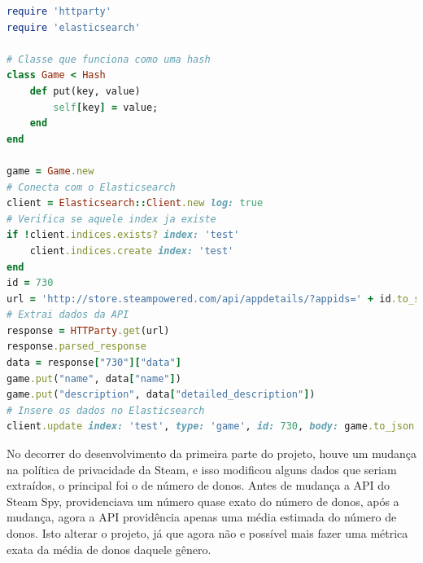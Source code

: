 \begin{lstlisting}[language={Ruby}, caption = {Código do \textit{Plugin}}, label = {code:plugin}]
require 'httparty'
require 'elasticsearch'

# Classe que funciona como uma hash
class Game < Hash
	def put(key, value)
		self[key] = value;
	end
end

game = Game.new
# Conecta com o Elasticsearch
client = Elasticsearch::Client.new log: true
# Verifica se aquele index ja existe
if !client.indices.exists? index: 'test'
	client.indices.create index: 'test'
end
id = 730
url = 'http://store.steampowered.com/api/appdetails/?appids=' + id.to_s
# Extrai dados da API
response = HTTParty.get(url)
response.parsed_response
data = response["730"]["data"]
game.put("name", data["name"])
game.put("description", data["detailed_description"])
# Insere os dados no Elasticsearch
client.update index: 'test', type: 'game', id: 730, body: game.to_json
\end{lstlisting}
No decorrer do desenvolvimento da primeira parte do projeto, houve um mudança na política de privacidade da Steam, e isso modificou alguns dados que seriam extraídos, o principal foi o de número de donos. Antes de mudança a API do Steam Spy, providenciava um número quase exato do número de donos, após a mudança, agora a API providência apenas uma média estimada do número de donos. Isto alterar o projeto, já que agora não e possível mais fazer uma métrica exata da média de donos daquele gênero.
